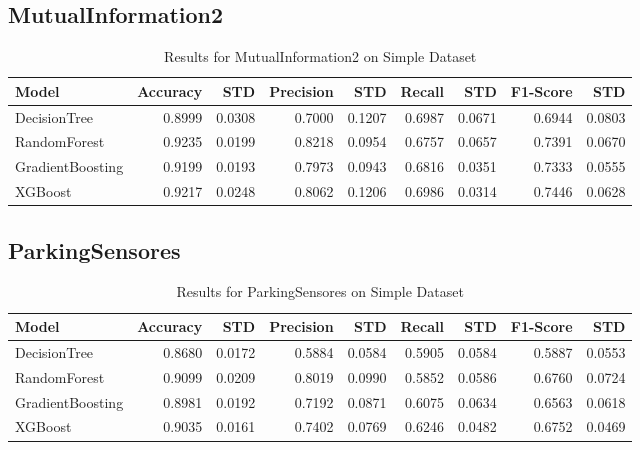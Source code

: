 \documentclass{article}
\begin{document}
\subsection{MutualInformation2}
\begin{table}[h!]
\centering
\caption{Results for MutualInformation2 on Simple Dataset}
\begin{tabular}{l|rr|rr|rr|rr}
\hline
Model & Accuracy & STD & Precision & STD & Recall & STD & F1-Score & STD \\
\hline
DecisionTree & 0.8999 & 0.0308 & 0.7000 & 0.1207 & 0.6987 & 0.0671 & 0.6944 & 0.0803 \\
RandomForest & 0.9235 & 0.0199 & 0.8218 & 0.0954 & 0.6757 & 0.0657 & 0.7391 & 0.0670 \\
GradientBoosting & 0.9199 & 0.0193 & 0.7973 & 0.0943 & 0.6816 & 0.0351 & 0.7333 & 0.0555 \\
XGBoost & 0.9217 & 0.0248 & 0.8062 & 0.1206 & 0.6986 & 0.0314 & 0.7446 & 0.0628 \\
\hline
\end{tabular}
\end{table}

\subsection{ParkingSensores}
\begin{table}[h!]
\centering
\caption{Results for ParkingSensores on Simple Dataset}
\begin{tabular}{l|rr|rr|rr|rr}
\hline
Model & Accuracy & STD & Precision & STD & Recall & STD & F1-Score & STD \\
\hline
DecisionTree & 0.8680 & 0.0172 & 0.5884 & 0.0584 & 0.5905 & 0.0584 & 0.5887 & 0.0553 \\
RandomForest & 0.9099 & 0.0209 & 0.8019 & 0.0990 & 0.5852 & 0.0586 & 0.6760 & 0.0724 \\
GradientBoosting & 0.8981 & 0.0192 & 0.7192 & 0.0871 & 0.6075 & 0.0634 & 0.6563 & 0.0618 \\
XGBoost & 0.9035 & 0.0161 & 0.7402 & 0.0769 & 0.6246 & 0.0482 & 0.6752 & 0.0469 \\
\hline
\end{tabular}
\end{table}
\end{document}

